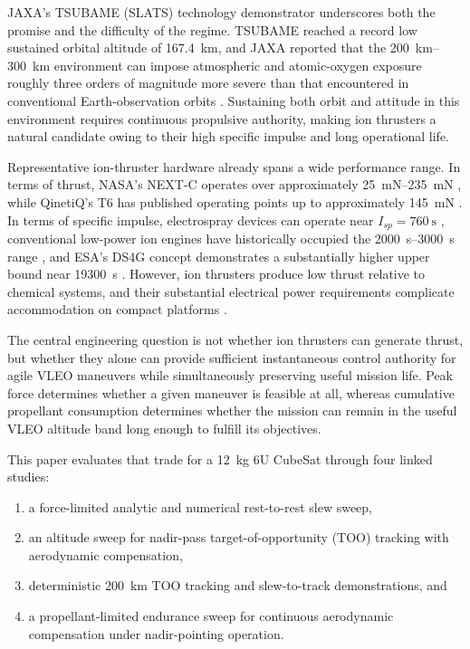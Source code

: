 \documentclass[conf]{new-aiaa}
\begin{document}
JAXA's TSUBAME (SLATS) technology demonstrator underscores both the promise and the difficulty of the regime. TSUBAME reached a record low sustained orbital altitude of \SI{167.4}{\kilo\meter}, and JAXA reported that the \SIrange{200}{300}{\kilo\meter} environment can impose atmospheric and atomic-oxygen exposure roughly three orders of magnitude more severe than that encountered in conventional Earth-observation orbits \cite{jaxavariety,jaxaterminate}. Sustaining both orbit and attitude in this environment requires continuous propulsive authority, making ion thrusters a natural candidate owing to their high specific impulse and long operational life.

Representative ion-thruster hardware already spans a wide performance range. In terms of thrust, NASA's NEXT-C operates over approximately \SIrange{25}{235}{\milli\newton} \cite{nextc}, while QinetiQ's T6 has published operating points up to approximately \SI{145}{\milli\newton} \cite{t6eval}. In terms of specific impulse, electrospray devices can operate near $I_{sp}=\SI{760}{\second}$ \cite{krejci2017}, conventional low-power ion engines have historically occupied the \SIrange{2000}{3000}{\second} range \cite{nasalowpower}, and ESA's DS4G concept demonstrates a substantially higher upper bound near \SI{19300}{\second} \cite{ds4goverview}. However, ion thrusters produce low thrust relative to chemical systems, and their substantial electrical power requirements complicate accommodation on compact platforms \cite{ionpropulsion,ionmotors}.

The central engineering question is not whether ion thrusters can generate thrust, but whether they alone can provide sufficient instantaneous control authority for agile VLEO maneuvers while simultaneously preserving useful mission life. Peak force determines whether a given maneuver is feasible at all, whereas cumulative propellant consumption determines whether the mission can remain in the useful VLEO altitude band long enough to fulfill its objectives.

This paper evaluates that trade for a \SI{12}{\kilogram} 6U CubeSat through four linked studies:
\begin{enumerate}
    \item a force-limited analytic and numerical rest-to-rest slew sweep,
    \item an altitude sweep for nadir-pass target-of-opportunity (TOO) tracking with aerodynamic compensation,
    \item deterministic \SI{200}{\kilo\meter} TOO tracking and slew-to-track demonstrations, and
    \item a propellant-limited endurance sweep for continuous aerodynamic compensation under nadir-pointing operation.
\end{enumerate}
\end{document}
